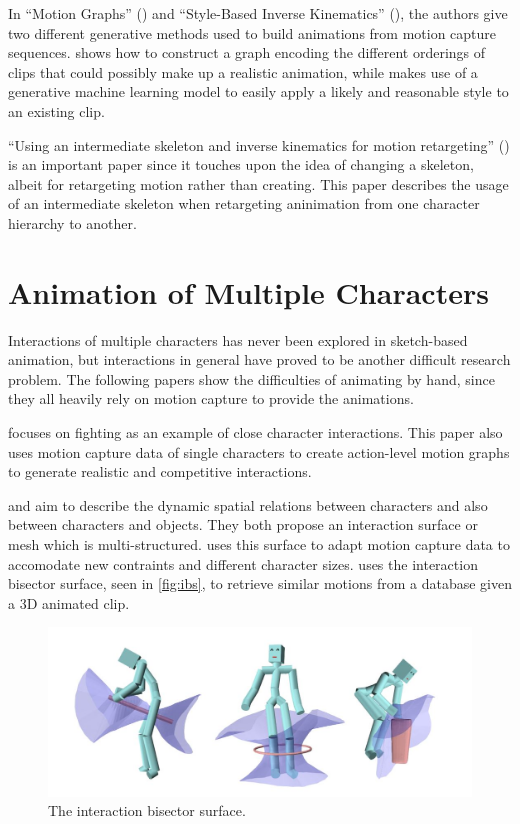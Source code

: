 In ``Motion Graphs'' (\citep{kovar2002motion}) and ``Style-Based Inverse Kinematics'' (\citep{grochow2004style}), the authors give two different generative methods used to build animations from motion capture sequences. \citep{kovar2002motion} shows how to construct a graph encoding the different orderings of clips that could possibly make up a realistic animation, while \citep{grochow2004style} makes use of a generative machine learning model to easily apply a likely and reasonable style to an existing clip.

``Using an intermediate skeleton and inverse kinematics for motion retargeting'' (\citep{monzani2000using}) is an important paper since it touches upon the idea of changing a skeleton, albeit for retargeting motion rather than creating. This paper describes the usage of an intermediate skeleton when retargeting aninimation from one character hierarchy to another.

\section{Animation of Multiple Characters}
Interactions of multiple characters has never been explored in sketch-based animation, but interactions in general have proved to be another difficult research problem. The following papers show the difficulties of animating by hand, since they all heavily rely on motion capture to provide the animations.

\citep{shum2007simulating} focuses on fighting as an example of close character interactions. This paper also uses motion capture data of single characters to create action-level motion graphs to generate realistic and competitive interactions.
  
\citep{ho2014multi} and \citep{zhao2017character} aim to describe the dynamic spatial relations between characters and also between characters and objects. They both propose an interaction surface or mesh which is multi-structured. \citep{ho2014multi} uses this surface to adapt motion capture data to accomodate new contraints and different character sizes. \citep{zhao2017character} uses the interaction bisector surface, seen in \autoref{fig:ibs}, to retrieve similar motions from a database given a 3D animated clip.

\begin{figure}[!h]
\centering
\includegraphics[scale=0.5]{img/ibs}
\caption{The interaction bisector surface.}
\label{fig:ibs}
\end{figure}


